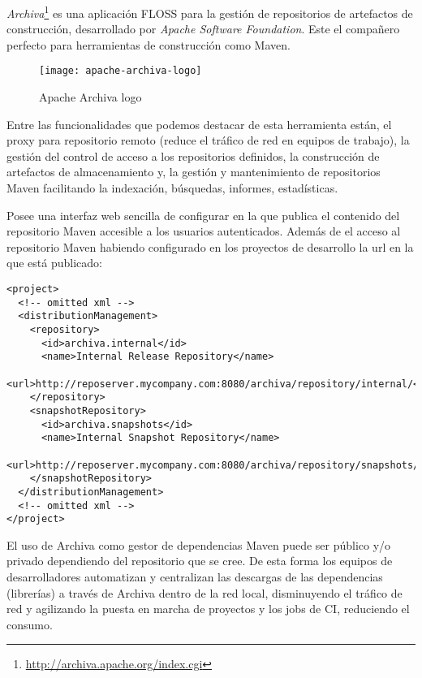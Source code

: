 \par \emph{Archiva}\footnote{\url{http://archiva.apache.org/index.cgi}} es una aplicación FLOSS para la gestión de repositorios de artefactos de construcción, desarrollado por \emph{Apache Software Foundation}. Este el compañero perfecto para herramientas de construcción como Maven.

\begin{figure}[H]
    \centering
    \texttt{[image: apache-archiva-logo]}
    \caption{Apache Archiva logo}
    \label{fi:apache-archiva}
\end{figure}

\par Entre las funcionalidades que podemos destacar de esta herramienta están, el proxy para repositorio remoto (reduce el tráfico de red en equipos de trabajo), la gestión del control de acceso a los repositorios definidos, la construcción de artefactos de almacenamiento y, la gestión y mantenimiento de repositorios Maven facilitando la indexación, búsquedas, informes, estadísticas.

\par Posee una interfaz web sencilla de configurar en la que publica el contenido del repositorio Maven accesible a los usuarios autenticados. Además de el acceso al repositorio Maven habiendo configurado en los proyectos de desarrollo la url en la que está publicado:

\lstset{style=xmlbasico}
\begin{lstlisting}[frame=trbl]
<project>
  <!-- omitted xml -->
  <distributionManagement>
    <repository>
      <id>archiva.internal</id>
      <name>Internal Release Repository</name>
      <url>http://reposerver.mycompany.com:8080/archiva/repository/internal/</url>
    </repository>
    <snapshotRepository>
      <id>archiva.snapshots</id>
      <name>Internal Snapshot Repository</name>
      <url>http://reposerver.mycompany.com:8080/archiva/repository/snapshots/</url>
    </snapshotRepository>
  </distributionManagement>
  <!-- omitted xml -->
</project>
\end{lstlisting}

\par El uso de Archiva como gestor de dependencias Maven puede ser público y/o privado dependiendo del repositorio que se cree. De esta forma los equipos de desarrolladores automatizan y centralizan las descargas de las dependencias (librerías) a través de Archiva dentro de la red local, disminuyendo el tráfico de red y agilizando la puesta en marcha de proyectos y los jobs de CI, reduciendo el consumo.

